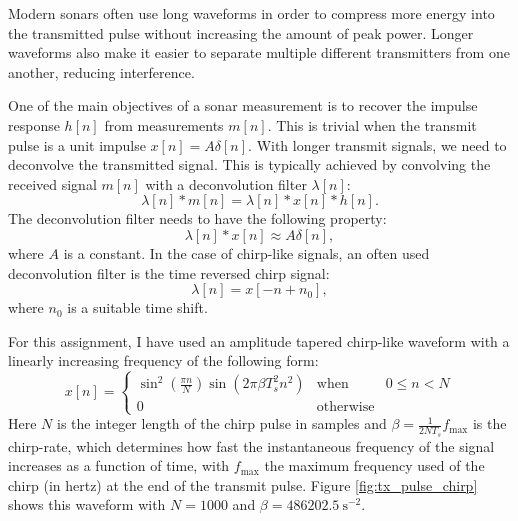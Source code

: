 Modern sonars often use long waveforms in order to compress more
energy into the transmitted pulse without increasing the amount of
peak power. Longer waveforms also make it easier to separate multiple
different transmitters from one another, reducing interference. 

One of the main objectives of a sonar measurement is to recover the impulse
response $h[n]$ from measurements $m[n]$. This is trivial when the
transmit pulse is a unit impulse $x[n]=A\delta[n]$. With longer
transmit signals, we need to deconvolve the transmitted signal. This
is typically achieved by convolving the received signal $m[n]$ with a deconvolution filter $\lambda[n]$:
\begin{equation}
  \lambda[n]*m[n] = \lambda[n] * x[n] * h[n].
\end{equation}
The deconvolution filter needs to have the following property:
\begin{equation}
  \lambda[n]*x[n] \approx A\delta[n],
\end{equation}
where $A$ is a constant. In the case of chirp-like signals, an often used deconvolution filter is the time reversed chirp signal:
\begin{equation}
  \lambda[n] = x[-n + n_0],
\end{equation}
where $n_0$ is a suitable time shift. 

For this assignment, I have used an amplitude tapered chirp-like
waveform with a linearly increasing frequency of the following form:
\begin{equation}
  x[n] = \left\{
\begin{array}{ccc}
  \sin^2\left(\frac{\pi n}{N}\right) \sin(2\pi \beta T_s^2 n^2) & \mathrm{when} & 0 \le n < N\\
  0 & \mathrm{otherwise} & 
  \end{array}\right.
\end{equation}
Here $N$ is the integer length of the chirp pulse in samples and
$\beta = \frac{1}{2 N T_s}f_{\mathrm{max}}$ is the chirp-rate, which
determines how fast the instantaneous frequency of the signal
increases as a function of time, with $f_{\mathrm{max}}$ the maximum
frequency used of the chirp (in hertz) at the end of the transmit
pulse. Figure \ref{fig:tx_pulse_chirp} shows this waveform with
$N=1000$ and $\beta = 486202.5\ \text{s}^{-2}$.


